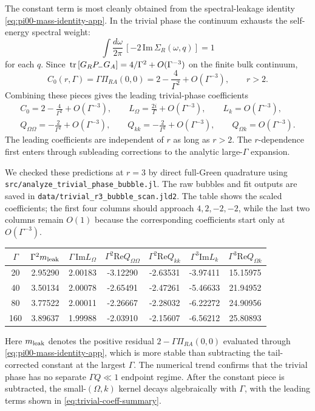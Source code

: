 \documentclass[aps,prx,preprint,amsmath,amssymb]{revtex4-2}
\newcommand{\tr}{{\rm \, tr\,}}
\renewcommand{\Re}{\text{Re}}
\renewcommand{\Im}{\text{Im}}
\begin{document}
The constant term is most cleanly obtained from the spectral-leakage identity
\eqref{eq:pi00-mass-identity-app}.  In the trivial phase the continuum exhausts
the self-energy spectral weight:
\[
\int\frac{d\omega}{2\pi}\,
\left[-2\,\mathrm{Im}\,\Sigma_R(\omega,q)\right]=1
\]
for each \(q\).  Since
\(\tr[G_RP_-G_A]=4/\Gamma^2+O(\Gamma^{-3})\) on the finite bulk continuum,
\begin{equation}
\label{eq:trivial-C0-result}
C_0(r,\Gamma)
=
\Gamma\Pi_{RA}(0,0)
=
2-\frac{4}{\Gamma^2}+O(\Gamma^{-3}),
\qquad r>2.
\end{equation}
Combining these pieces gives the leading trivial-phase coefficients
\begin{equation}
\label{eq:trivial-coeff-summary}
\begin{gathered}
C_0=2-\frac{4}{\Gamma^2}+O(\Gamma^{-3}),
\qquad
L_\Omega=\frac{2i}{\Gamma}+O(\Gamma^{-3}),
\qquad
L_k=O(\Gamma^{-3}),
\\
Q_{\Omega\Omega}=-\frac{2}{\Gamma^2}+O(\Gamma^{-3}),
\qquad
Q_{kk}=-\frac{2}{\Gamma^2}+O(\Gamma^{-3}),
\qquad
Q_{\Omega k}=O(\Gamma^{-3}).
\end{gathered}
\end{equation}
The leading coefficients are independent of \(r\) as long as \(r>2\).  The
\(r\)-dependence first enters through subleading corrections to the analytic
large-\(\Gamma\) expansion.

We checked these predictions at \(r=3\) by direct full-Green quadrature using
\texttt{src/analyze\_trivial\_phase\_bubble.jl}.  The raw bubbles and fit
outputs are saved in \texttt{data/trivial\_r3\_bubble\_scan.jld2}.  The table
shows the scaled coefficients; the first four columns should approach
\(4,2,-2,-2\), while the last two columns remain \(O(1)\) because the
corresponding coefficients start only at \(O(\Gamma^{-3})\).
\begin{center}
\begin{tabular}{ccccccc}
\toprule
\(\Gamma\) &
\(\Gamma^2m_{\rm leak}\) &
\(\Gamma\,\Im L_\Omega\) &
\(\Gamma^2\Re Q_{\Omega\Omega}\) &
\(\Gamma^2\Re Q_{kk}\) &
\(\Gamma^3\Im L_k\) &
\(\Gamma^3\Re Q_{\Omega k}\) \\
\midrule
20  & 2.95290 & 2.00183 & -3.12290 & -2.63531 & -3.97411 & 15.15975 \\
40  & 3.50134 & 2.00078 & -2.65491 & -2.47261 & -5.46633 & 21.94952 \\
80  & 3.77522 & 2.00011 & -2.26667 & -2.28032 & -6.22272 & 24.90956 \\
160 & 3.89637 & 1.99988 & -2.03910 & -2.15607 & -6.56212 & 25.80893 \\
\bottomrule
\end{tabular}
\end{center}
Here \(m_{\rm leak}\) denotes the positive residual
\(2-\Gamma\Pi_{RA}(0,0)\) evaluated through
\eqref{eq:pi00-mass-identity-app}, which is more stable than subtracting the
tail-corrected constant at the largest \(\Gamma\).  The numerical trend confirms
that the trivial phase has no separate \(\Gamma Q\ll1\) endpoint regime.  After
the constant piece is subtracted, the small-\((\Omega,k)\) kernel decays
algebraically with \(\Gamma\), with the leading terms shown in
\eqref{eq:trivial-coeff-summary}.
\end{document}
